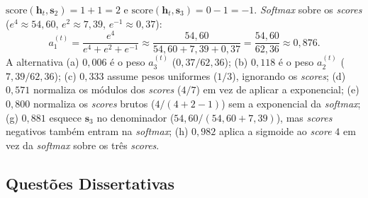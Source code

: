 \documentclass{dlproblemset}
\begin{document}
\begin{enumerate}[I)]
    $\mathrm{score}(\mathbf{h}_t, \mathbf{s}_2) = 1 + 1 = 2$ e
    $\mathrm{score}(\mathbf{h}_t, \mathbf{s}_3) = 0 - 1 = -1$. \textit{Softmax} sobre os
    \textit{scores} ($e^{4} \approx 54{,}60$, $e^{2} \approx 7{,}39$, $e^{-1} \approx 0{,}37$):
    \[
    a_1^{(t)} = \frac{e^{4}}{e^{4} + e^{2} + e^{-1}} \approx \frac{54{,}60}{54{,}60 + 7{,}39 + 0{,}37} = \frac{54{,}60}{62{,}36} \approx 0{,}876.
    \]
    A alternativa (a) $0{,}006$ é o peso $a_3^{(t)}$ ($0{,}37/62{,}36$); (b) $0{,}118$ é o peso
    $a_2^{(t)}$ ($7{,}39/62{,}36$); (c) $0{,}333$ assume pesos uniformes ($1/3$), ignorando os
    \textit{scores}; (d) $0{,}571$ normaliza os módulos dos \textit{scores} ($4/7$) em vez de
    aplicar a exponencial; (e) $0{,}800$ normaliza os \textit{scores} brutos ($4/(4+2-1)$) sem a
    exponencial da \textit{softmax}; (g) $0{,}881$ esquece $\mathbf{s}_3$ no denominador
    ($54{,}60/(54{,}60+7{,}39)$), mas \textit{scores} negativos também entram na
    \textit{softmax}; (h) $0{,}982$ aplica a sigmoide ao \textit{score} $4$ em vez da
    \textit{softmax} sobre os três \textit{scores}.
\end{enumerate}
\color{black}

\newpage

\subsection*{Questões Dissertativas}
\end{document}
